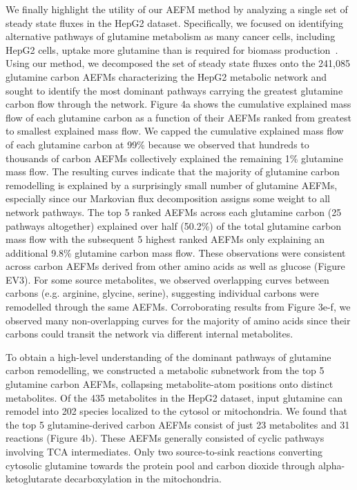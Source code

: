 \documentclass[12pt]{article}
\begin{document}
We finally highlight the utility of our AEFM method by analyzing a single set
of steady state fluxes in the HepG2 dataset. Specifically, we focused on
identifying alternative pathways of glutamine metabolism as many cancer cells,
including HepG2 cells, uptake more glutamine than is required for biomass
production~\citep{YeYanyan2023Gmri,YooHeeChan2020Gric}. Using our method, we
decomposed the set of steady state fluxes onto the 241,085 glutamine carbon
AEFMs characterizing the HepG2 metabolic network and sought to identify the
most dominant pathways carrying the greatest glutamine carbon flow through
the network. Figure 4a shows the cumulative explained mass flow of each
glutamine carbon as a function of their AEFMs ranked from greatest to
smallest explained mass flow. We capped the cumulative explained mass flow
of each glutamine carbon at 99\% because we observed that hundreds to
thousands of carbon AEFMs collectively explained the remaining 1\%
glutamine mass flow. The resulting curves indicate that the majority of
glutamine carbon remodelling is explained by a surprisingly small number
of glutamine AEFMs, especially since our Markovian flux decomposition
assigns some weight to all network pathways. The top 5 ranked AEFMs across
each glutamine carbon (25 pathways altogether) explained over half
(50.2\%) of the total glutamine carbon mass flow with the subsequent
5 highest ranked AEFMs only explaining an additional 9.8\% glutamine
carbon mass flow. These observations were consistent across carbon AEFMs
derived from other amino acids as well as glucose (Figure EV3). For some
source metabolites, we observed overlapping curves between carbons (e.g.
arginine, glycine, serine), suggesting individual carbons were remodelled
through the same AEFMs. Corroborating results from Figure 3e-f, we
observed many non-overlapping curves for the majority of amino acids since
their carbons could transit the network via different internal
metabolites.


To obtain a high-level understanding of the dominant pathways of glutamine
carbon remodelling, we constructed a metabolic subnetwork from the top
5 glutamine carbon AEFMs, collapsing metabolite-atom positions onto distinct
metabolites. Of the 435 metabolites in the HepG2 dataset, input glutamine
can remodel into 202 species localized to the cytosol or mitochondria. We
found that the top 5 glutamine-derived carbon AEFMs consist of just 23
metabolites and 31 reactions (Figure 4b). These AEFMs generally consisted
of cyclic pathways involving TCA intermediates. Only two source-to-sink
reactions converting cytosolic glutamine towards the protein pool and
carbon dioxide through alpha-ketoglutarate decarboxylation in the
mitochondria. 
\end{document}
